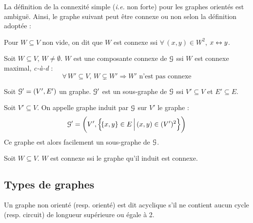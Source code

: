 		\begin{Remarque}
			La définition de la connexité simple (\emph{i.e.} non forte) pour les graphes orientés est ambiguë. Ainsi, le graphe suivant peut être connexe ou non selon la définition adoptée :
		\end{Remarque}
	
		\begin{Definition}
			Pour \(W\subseteq V\) non vide, on dit que \(W\) est connexe ssi \(\forall\,(x,y)\in W^2\), \(x\leftrightarrow y\).
		\end{Definition}
		
		\eqskip{2mm}
		\begin{Propriete}
			Soit \(W\subseteq V\), \(W \neq \emptyset\). \(W\) est une composante connexe de \(\EuScript{G}\) ssi \(W\) est connexe maximal, \emph{c-à-d} :
				\[
					\forall\,W' \subseteq V,\, W \subsetneq W' \Longrightarrow W' \text{ n'est pas connexe}
				\]
		\end{Propriete}
	
		\begin{Definition}
			Soit \(\EuScript{G}' = (V',E')\) un graphe. \(\EuScript{G}'\) est un sous-graphe de \(\EuScript{G}\) ssi \(V' \subseteq V\) et \(E' \subseteq E\).
		\end{Definition}
	
		\begin{Definition}
			Soit \(V'\subseteq V\). On appelle graphe induit par \(\EuScript{G}\) sur \(V'\) le graphe :
				\[
					\EuScript{G}' = \left(V',\left\{\!\{x,y\}\in E\,\middle|\, (x,y) \in (V')^2\right\}\right)
				\]
			Ce graphe est alors facilement un sous-graphe de \(\EuScript{G}\).
		\end{Definition}
		
		\begin{Propriete}
			Soit \(W\subseteq V\). \(W\) est connexe ssi le graphe qu'il induit est connexe.
		\end{Propriete}
	
	\subsection{Types de graphes}
		
		\begin{Definition}
			Un graphe non orienté (resp.\! orienté) est dit acyclique s'il ne contient aucun cycle (resp.\! circuit) de longueur supérieure ou égale à 2.
		\end{Definition}
	
